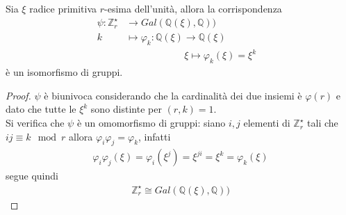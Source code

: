 \begin{teorema}
Sia $\xi$ radice primitiva $r$-esima dell'unità, allora la corrispondenza
\begin{align*}
\psi: \mathbb{Z}_{r}^{\star} & \longrightarrow  Gal(\mathbb{Q}(\xi), \mathbb{Q})) &   \\
                           k &\longmapsto  \varphi_{k} : \mathbb{Q}(\xi)  \longrightarrow  \mathbb{Q}(\xi) \\
                                              & \qquad \qquad \qquad \xi \longmapsto \varphi_{k}(\xi) = \xi^{k}
\end{align*}
è un isomorfismo di gruppi.
\end{teorema}
\begin{proof}
$\psi$ è biunivoca considerando che la cardinalità dei due insiemi è $\varphi(r)$ e dato che tutte le $\xi^k$ sono distinte per $(r,k)=1$.\\
Si verifica che $\psi$ è un omomorfismo di gruppi:
siano $i,j$ elementi di $\mathbb{Z}_{r}^{\star}$ tali che $ij \equiv k \mod{r}$ allora $\varphi_{i}\varphi_{j} = \varphi_{k}$, infatti
\begin{align*}
   \varphi_{i}\varphi_{j}(\xi) = \varphi_{i}(\xi^{j}) = \xi^{ji} = \xi^{k} = \varphi_{k}(\xi)
\end{align*}
segue quindi
\begin{align*}
   \mathbb{Z}_{r}^{\star} \cong  Gal(\mathbb{Q}(\xi), \mathbb{Q}))
\end{align*}
\end{proof}

